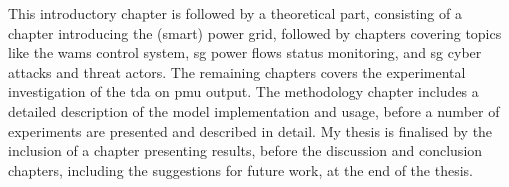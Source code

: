 This introductory chapter is followed by a theoretical part, consisting of a chapter introducing the (smart) power grid, followed by chapters covering topics like the \acrshort{wams} control system, \acrfull{sg} power flows status monitoring, and \acrlong{sg} cyber attacks and threat actors. 
The remaining chapters covers the experimental investigation of the \acrlong{tda} on \acrlong{pmu} output. The methodology chapter includes a detailed description of the model implementation and usage, before a number of experiments are presented and described in detail.
My thesis is finalised by the inclusion of a chapter presenting results, before the discussion and conclusion chapters, including the suggestions for future work, at the end of the thesis. 

